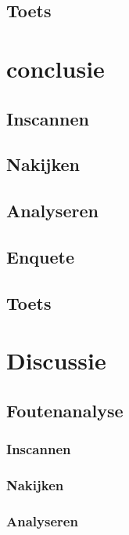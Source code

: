 \documentclass[12pt]{article}
\begin{document}
\pagebreak
\subsection{Toets}

\pagebreak
\section{conclusie}
\subsection{Inscannen}


\subsection{Nakijken}


\subsection{Analyseren}


\subsection{Enquete}


\subsection{Toets}

\pagebreak
\section{Discussie}
\subsection{Foutenanalyse}
\subsubsection{Inscannen}


\subsubsection{Nakijken}


\subsubsection{Analyseren}
\end{document}
